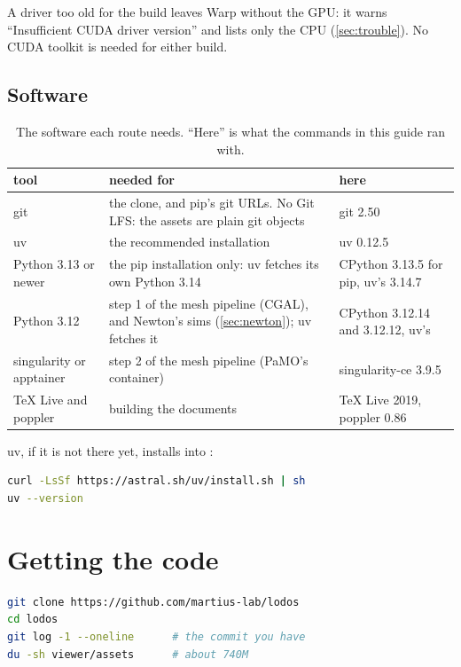 A driver too old for the build leaves Warp without the GPU: it warns ``Insufficient CUDA driver version'' and lists only the CPU (\cref{sec:trouble}). No CUDA toolkit is needed for either build.

\subsection{Software}\label{sec:software}

\begin{table}[h]
\centering
\caption{The software each route needs. ``Here'' is what the commands in this guide ran with.}
\label{tab:software}
\small
\begin{tabularx}{\linewidth}{@{}L{30mm}YL{40mm}@{}}
\toprule
tool & needed for & here \\
\midrule
git & the clone, and pip's git URLs. No Git LFS: the assets are plain git objects & git 2.50 \\
uv & the recommended installation & uv 0.12.5 \\
Python 3.13 or newer & the pip installation only: uv fetches its own Python 3.14 & CPython 3.13.5 for pip, uv's 3.14.7 \\
Python 3.12 & step 1 of the mesh pipeline (CGAL), and Newton's sims (\cref{sec:newton}); uv fetches it & CPython 3.12.14 and 3.12.12, uv's \\
singularity or apptainer & step 2 of the mesh pipeline (PaMO's container) & singularity-ce 3.9.5 \\
TeX Live and poppler & building the documents & TeX Live 2019, poppler 0.86 \\
\bottomrule
\end{tabularx}
\end{table}

uv, if it is not there yet, installs into :

\begin{lstlisting}[language=bash]
curl -LsSf https://astral.sh/uv/install.sh | sh
uv --version
\end{lstlisting}

\section{Getting the code}\label{sec:clone}

\begin{lstlisting}[language=bash]
git clone https://github.com/martius-lab/lodos
cd lodos
git log -1 --oneline      # the commit you have
du -sh viewer/assets      # about 740M
\end{lstlisting}


